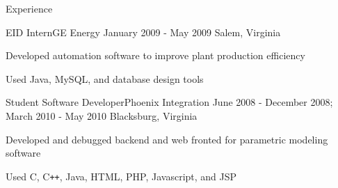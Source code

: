 \documentclass{resume}
\begin{document}
\begin{section}{Experience}
		\begin{experience}{EID Intern}{GE Energy}
		                  {January 2009 - May 2009}
		                  {Salem, Virginia}
			\item Developed automation software to improve plant production
			      efficiency
			\item Used Java, MySQL, and database design tools
		\end{experience}

		\begin{experience}{Student Software Developer}{Phoenix Integration}
		                  {June 2008 - December 2008; March 2010 - May 2010}
		                  {Blacksburg, Virginia}
			\item Developed and debugged backend and web fronted for parametric
			      modeling software
			\item Used C, C\texttt{++}, Java, HTML, PHP, Javascript, and JSP
		\end{experience}
	\end{section}
\end{document}
